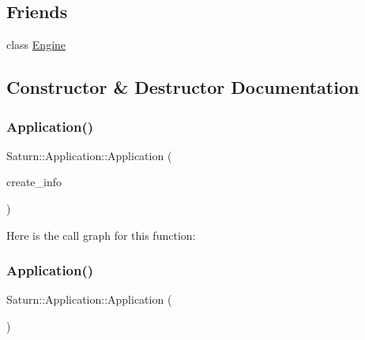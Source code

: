 \subsection*{Friends}
\begin{DoxyCompactItemize}
\item 
class \mbox{\hyperlink{class_saturn_1_1_application_a3e1914489e4bed4f9f23cdeab34a43dc}{Engine}}
\end{DoxyCompactItemize}


\subsection{Constructor \& Destructor Documentation}
\mbox{\label{class_saturn_1_1_application_aaafa436d6d0bece4451d49f401b338f1}} 
\subsubsection{\texorpdfstring{Application()}{Application()}\hspace{0.1cm}{\footnotesize\ttfamily [1/3]}}
{\footnotesize\ttfamily Saturn\+::\+Application\+::\+Application (\begin{DoxyParamCaption}\item[{\mbox{\hyperlink{struct_saturn_1_1_application_1_1_create_info}{Create\+Info}}}]{create\+\_\+info }\end{DoxyParamCaption})}

Here is the call graph for this function\+:
\mbox{\label{class_saturn_1_1_application_ae7d9f4ccbae7382d9ae4fc74763b142d}} 
\subsubsection{\texorpdfstring{Application()}{Application()}\hspace{0.1cm}{\footnotesize\ttfamily [2/3]}}
{\footnotesize\ttfamily Saturn\+::\+Application\+::\+Application (\begin{DoxyParamCaption}\item[{\mbox{\hyperlink{class_saturn_1_1_application}{Application}} const \&}]{ }\end{DoxyParamCaption})\hspace{0.3cm}{\ttfamily [delete]}}

